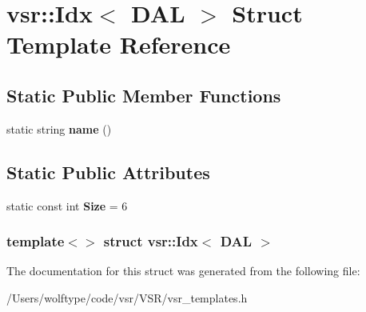 \hypertarget{structvsr_1_1_idx_3_01_d_a_l_01_4}{\section{vsr\-:\-:Idx$<$ D\-A\-L $>$ Struct Template Reference}
\label{structvsr_1_1_idx_3_01_d_a_l_01_4}
}
\subsection*{Static Public Member Functions}
\begin{DoxyCompactItemize}
\item 
\hypertarget{structvsr_1_1_idx_3_01_d_a_l_01_4_ab5dec630be182242460edf169bb1985d}{static string {\bfseries name} ()}\label{structvsr_1_1_idx_3_01_d_a_l_01_4_ab5dec630be182242460edf169bb1985d}

\end{DoxyCompactItemize}
\subsection*{Static Public Attributes}
\begin{DoxyCompactItemize}
\item 
\hypertarget{structvsr_1_1_idx_3_01_d_a_l_01_4_a757e22a7b73bdb2e8a909f88f7a735de}{static const int {\bfseries Size} = 6}\label{structvsr_1_1_idx_3_01_d_a_l_01_4_a757e22a7b73bdb2e8a909f88f7a735de}

\end{DoxyCompactItemize}
\subsubsection*{template$<$$>$ struct vsr\-::\-Idx$<$ D\-A\-L $>$}



The documentation for this struct was generated from the following file\-:\begin{DoxyCompactItemize}
\item 
/\-Users/wolftype/code/vsr/\-V\-S\-R/vsr\-\_\-templates.\-h\end{DoxyCompactItemize}
